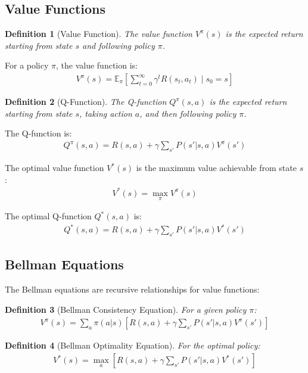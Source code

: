 \documentclass{article}
\newtheorem{definition}{Definition}
\begin{document}
\subsection{Value Functions}
\begin{definition}[Value Function]
The value function $V^\pi(s)$ is the expected return starting from state $s$ and following policy $\pi$.
\end{definition}

For a policy $\pi$, the value function is:
\begin{align}
V^\pi(s) = \mathbb{E}_\pi\left[\sum_{t=0}^{\infty}\gamma^t R(s_t, a_t) \mid s_0 = s\right]
\end{align}

\begin{definition}[Q-Function]
The Q-function $Q^\pi(s, a)$ is the expected return starting from state $s$, taking action $a$, and then following policy $\pi$.
\end{definition}

The Q-function is:
\begin{align}
Q^\pi(s, a) = R(s, a) + \gamma\sum_{s'}P(s'|s, a)V^\pi(s')
\end{align}

The optimal value function $V^*(s)$ is the maximum value achievable from state $s$:
\begin{align}
V^*(s) = \max_\pi V^\pi(s)
\end{align}

The optimal Q-function $Q^*(s, a)$ is:
\begin{align}
Q^*(s, a) = R(s, a) + \gamma\sum_{s'}P(s'|s, a)V^*(s')
\end{align}

\subsection{Bellman Equations}
The Bellman equations are recursive relationships for value functions:

\begin{definition}[Bellman Consistency Equation]
For a given policy $\pi$:
\begin{align}
V^\pi(s) = \sum_a \pi(a|s)\left[R(s, a) + \gamma\sum_{s'}P(s'|s, a)V^\pi(s')\right]
\end{align}
\end{definition}

\begin{definition}[Bellman Optimality Equation]
For the optimal policy:
\begin{align}
V^*(s) = \max_a\left[R(s, a) + \gamma\sum_{s'}P(s'|s, a)V^*(s')\right]
\end{align}
\end{definition}
\end{document}
